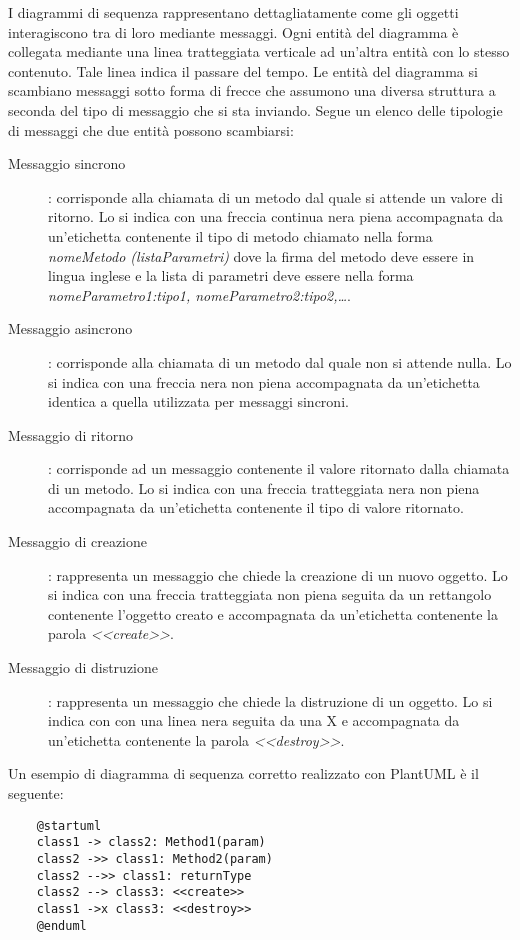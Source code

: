 \documentclass[../../norme-di-progetto.tex]{subfiles}
\begin{document}
I diagrammi di sequenza rappresentano dettagliatamente come gli oggetti interagiscono tra di loro mediante messaggi. Ogni entità del diagramma è collegata mediante una linea tratteggiata verticale ad un'altra entità con lo stesso contenuto. Tale linea indica il passare del tempo. Le entità del diagramma si scambiano messaggi sotto forma di frecce che assumono una diversa struttura a seconda del tipo di messaggio che si sta inviando. Segue un elenco delle tipologie di messaggi che due entità possono scambiarsi:
\begin{description}
  \item [Messaggio sincrono]: corrisponde alla chiamata di un metodo dal quale si attende un valore di ritorno. Lo si indica con una freccia continua nera piena accompagnata da un'etichetta contenente il tipo di metodo chiamato nella forma \textit{nomeMetodo (listaParametri)} dove la firma del metodo deve essere in lingua inglese e la lista di parametri deve essere nella forma \textit{nomeParametro1:tipo1, nomeParametro2:tipo2,\ldots}.
  \item [Messaggio asincrono]: corrisponde alla chiamata di un metodo dal quale non si attende nulla. Lo si indica con una freccia nera non piena accompagnata da un'etichetta identica a quella utilizzata per messaggi sincroni.
  \item [Messaggio di ritorno]: corrisponde ad un messaggio contenente il valore ritornato dalla chiamata di un metodo. Lo si indica con una freccia tratteggiata nera non piena accompagnata da un'etichetta contenente il tipo di valore ritornato.
  \item [Messaggio di creazione]: rappresenta un messaggio che chiede la creazione di un nuovo oggetto. Lo si indica con una freccia tratteggiata non piena seguita da un rettangolo contenente l'oggetto creato e accompagnata da un'etichetta contenente la parola \textit{<<create>>}.
  \item [Messaggio di distruzione]: rappresenta un messaggio che chiede la distruzione di un oggetto. Lo si indica con con una linea nera  seguita da una X e accompagnata da un'etichetta contenente la parola \textit{<<destroy>>}.
\end{description}
Un esempio di diagramma di sequenza corretto realizzato con PlantUML è il seguente:
\begin{center}
  \begin{verbatim}
    @startuml
    class1 -> class2: Method1(param)
    class2 ->> class1: Method2(param)
    class2 -->> class1: returnType
    class2 --> class3: <<create>>
    class1 ->x class3: <<destroy>>
    @enduml
 \end{verbatim}
\end{center}
\end{document}
